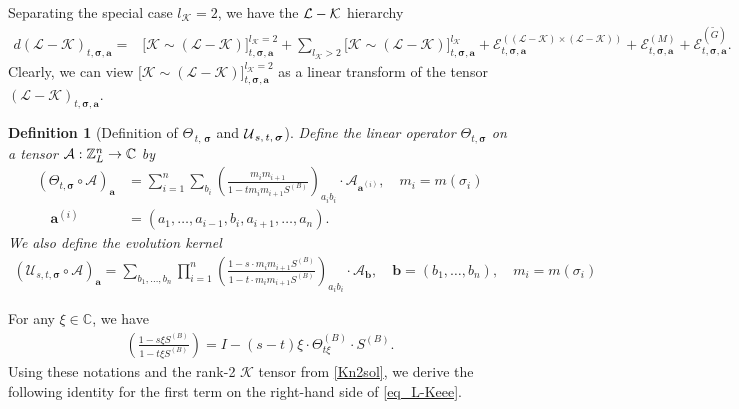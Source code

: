 \documentclass[10pt,reqno]{article}
\theoremstyle{plain} %
\newtheorem{definition}[theorem]{Definition}
\theoremstyle{remark}
\numberwithin{equation}{section}
\begin{document}
Separating the special case $l_\mathcal{K} =2$, we have 
 the  $\cal L-K$ hierarchy 
\begin{align}\label{eq_L-Keee}
    d(\mathcal{L} - \mathcal{K})_{t, \boldsymbol{\sigma}, \textbf{a}} = &
    \Big[\mathcal{K} \sim (\mathcal{L} - \mathcal{K})\Big]^{l_\mathcal{K} = 2}_{t, \boldsymbol{\sigma}, \textbf{a}} + \sum_{l_\mathcal{K} > 2} \Big[\mathcal{K} \sim (\mathcal{L} - \mathcal{K})\Big]^{l_\mathcal{K}}_{t, \boldsymbol{\sigma}, \textbf{a}} + \mathcal{E}^{((\mathcal{L} - \mathcal{K}) \times (\mathcal{L} - \mathcal{K}))}_{t, \boldsymbol{\sigma}, \textbf{a}} +
    \mathcal{E}^{(M)}_{t, \boldsymbol{\sigma}, \textbf{a}} +
    \mathcal{E}^{(\widetilde{G})}_{t, \boldsymbol{\sigma}, \textbf{a}}.
\end{align} 
Clearly, we can view $\Big[\mathcal{K} \sim (\mathcal{L} - \mathcal{K})\Big]^{l_\mathcal{K} = 2}_{t, \boldsymbol{\sigma}, \textbf{a}}$ as a linear transform of  the  tensor $(\mathcal{L} - \mathcal{K})_{t, \boldsymbol{\sigma}, \textbf{a}}$.



\begin{definition}[Definition of ${\varTheta}_{\,t, \,\boldsymbol{\sigma}}$ and ${\cal U}_{\,s,\, t, \,\boldsymbol{\sigma}}$]\label{DefTHUST}
Define the linear operator ${\varTheta}_{t, \boldsymbol{\sigma}}$ on a tensor ${\cal A}: \mathbb Z^n_L\to \mathbb C$ by 
\begin{align}
    \left({{\varTheta}}_{t, \boldsymbol{\sigma}} \circ \mathcal{A}\right)_{\textbf{a}} & = \sum_{i=1}^n \sum_{b_i} \left(\frac{m_i m_{i+1}  }{1 - t m_i m_{i+1} S^{(B)}}\right)_{a_i b_i} \cdot \mathcal{A}_{\textbf{a}^{(i)}},\quad m_i=m(\sigma_i) \nonumber \\
    \quad \textbf{a}^{(i)}&  = (a_1, \ldots, a_{i-1}, b_i, a_{i+1}, \ldots, a_n).
\end{align}  
We also define the evolution kernel 
    \begin{align}\label{def_Ustz}
        \left(\mathcal{U}_{s, t, \boldsymbol{\sigma}} \circ \mathcal{A}\right)_{\textbf{a}} = \sum_{b_1, \ldots, b_n} \prod_{i=1}^n \left(\frac{1 - s \cdot m_i m_{i+1} S^{(B)}}{1 - t \cdot m_i m_{i+1} S^{(B)}}\right)_{a_i b_i} \cdot \mathcal{A}_{\textbf{b}}, \quad \textbf{b} = (b_1, \ldots, b_n), \quad m_i=m(\sigma_i)
    \end{align}
\end{definition}
For any $\xi \in \mathbb{C}$, we have 
 \begin{align}\label{def_Ustz_2}
\left(\frac{1 - s \xi S^{(B)}}{1 - t \xi S^{(B)}}\right) = I - (s - t) \xi \cdot \Theta^{(B)}_{t \xi} \cdot S^{(B)}.
\end{align}
Using these notations and the rank-2 $\mathcal{K}$ tensor from \eqref{Kn2sol}, we derive the following identity for the first term on the right-hand side of \eqref{eq_L-Keee}.
\end{document}
